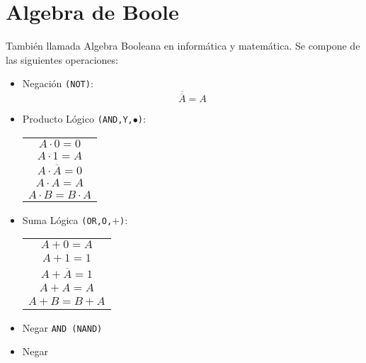 \chapter{Algebra de Boole}
También llamada Algebra Booleana en informática y matemática. Se compone de las siguientes operaciones:
\begin{itemize}
\item Negación \texttt{(NOT)}:
$$\overline{\overline{A}}=A$$
\item Producto Lógico \texttt{(AND,Y,$\bullet$)}:
\begin{center}
\begin{tabular}{|c|}
\hline 
$A\cdot 0=0$ \\ 

$A\cdot 1=A$ \\ 

$A\cdot\overline{A}=0$ \\ 

$A\cdot A=A$ \\ 

$A\cdot B=B\cdot A$ \\ 
\hline 
\end{tabular} 
\end{center}
\item Suma Lógica \texttt{(OR,O,$+$)}:
\begin{center}
\begin{tabular}{|c|}
\hline 
$A+0=A$ \\ 

$A+1=1$ \\ 

$A+\overline{A}=1$ \\ 
 
$A+A=A$ \\ 

$A+B=B+A$ \\ 
\hline 
\end{tabular} 
\end{center}
\item Negar \texttt{AND (NAND)} 
\item Negar

\end{itemize}
